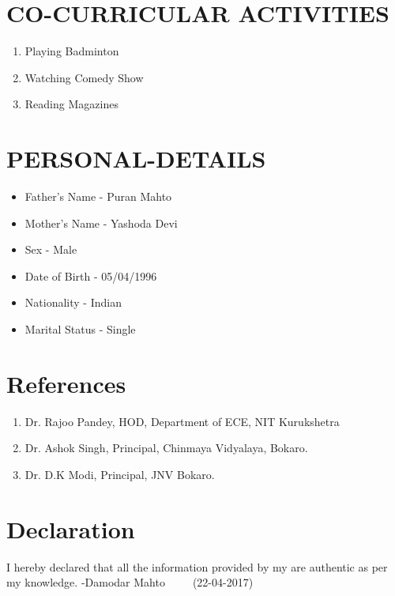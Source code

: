 \documentclass[11pt,a4paper,sans]{moderncv}
\begin{document}
\section{CO-CURRICULAR ACTIVITIES}
\begin{enumerate}
\item Playing Badminton
\item Watching Comedy Show
\item Reading Magazines
\end{enumerate}

\section{PERSONAL-DETAILS}
\begin{itemize}
\item Father's Name - Puran Mahto
\item Mother's Name - Yashoda Devi
\item Sex - Male
\item Date of Birth - 05/04/1996
\item Nationality - Indian
\item Marital Status - Single
\end{itemize}

\section{References}
\begin{enumerate}
\item Dr. Rajoo Pandey, HOD, Department of ECE, NIT Kurukshetra
\item Dr. Ashok Singh, Principal, Chinmaya Vidyalaya, Bokaro.
\item Dr. D.K Modi, Principal, JNV Bokaro.
\end{enumerate}

\section{Declaration}
I hereby declared that all the information provided by my are authentic as per my knowledge. 
\newline \newline     -Damodar Mahto\newline\ \ \ \ \ (22-04-2017)
\clearpage
\end{document}
